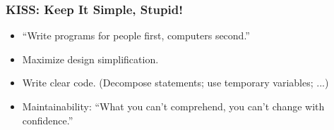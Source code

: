 \begin{frame}
	\frametitle{KISS: Keep It Simple, Stupid!}
	\begin{itemize}[<+-| highlight@+>]
		\item ``Write programs for people first, computers second.''
		\item Maximize design simplification.
		\item Write clear code. (Decompose statements; use temporary variables; ...)
		\item Maintainability: ``What you can't comprehend, you can't change with confidence.''
	\end{itemize}
\end{frame}

